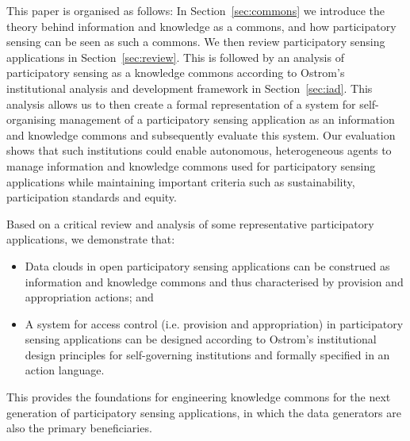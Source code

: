 This paper is organised as follows: In Section~\ref{sec:commons} we introduce the theory behind information and knowledge as a commons, and how participatory sensing can be seen as such a commons. 
We then review participatory sensing applications in Section~\ref{sec:review}. This is followed by an analysis of participatory sensing as a knowledge commons according to Ostrom's institutional analysis and development framework in Section~\ref{sec:iad}. 
This analysis allows us to then create a formal representation of a system for self-organising management of a participatory sensing application as an information and knowledge commons and subsequently evaluate this system. 
Our evaluation shows that such institutions could enable autonomous, heterogeneous agents to manage information and knowledge commons used for participatory sensing applications while maintaining important criteria such as sustainability, participation standards and equity.

Based on a critical review and analysis of some representative participatory applications, we demonstrate that:
\begin{itemize}
\item Data clouds in open participatory sensing applications can be construed as information and knowledge commons and thus characterised by provision and appropriation actions; and
\item A system for access control (i.e. provision and appropriation) in participatory sensing applications can be designed according to Ostrom's institutional design principles for self-governing institutions and formally specified in an action language.
\end{itemize}

This provides the foundations for engineering knowledge commons for the next generation
of participatory sensing applications, in which the data generators are also the primary beneficiaries.


